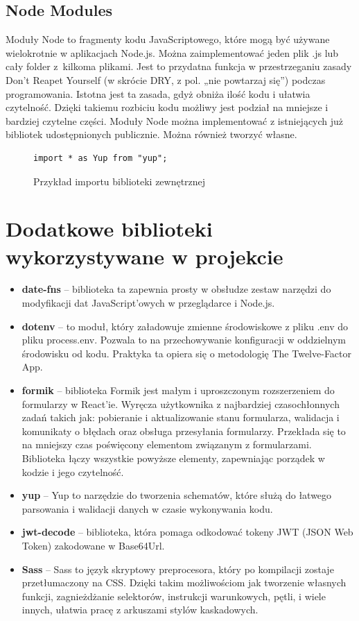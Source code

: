 \documentclass[a4paper,twoside,12pt]{book}
\begin{document}
\subsection{Node Modules}
Moduły Node to fragmenty kodu JavaScriptowego, które mogą być używane wielokrotnie w aplikacjach Node.js. Można zaimplementować jeden plik .js lub cały folder z~kilkoma plikami. Jest to przydatna funkcja w przestrzeganiu zasady Don't Reapet Yourself (w skrócie DRY, z pol. „nie powtarzaj się”) podczas programowania. Istotna jest ta zasada, gdyż obniża ilość kodu i ułatwia czytelność. Dzięki takiemu rozbiciu kodu możliwy jest podział na mniejsze i bardziej czytelne części. Moduły Node można implementować z istniejących już bibliotek udostępnionych publicznie. Można również tworzyć własne.
\begin{figure}[H]
    \begin{lstlisting}
import * as Yup from "yup";
    \end{lstlisting}
    \caption{Przykład importu biblioteki zewnętrznej}
    \label{fig:pseudokod:listings}
\end{figure}
\section{Dodatkowe biblioteki wykorzystywane w projekcie}
\begin{itemize}
    \item \textbf{date-fns} -- biblioteka ta zapewnia prosty w obsłudze zestaw narzędzi do modyfikacji dat JavaScript’owych w przeglądarce i Node.js.
    \item \textbf{dotenv} -- to moduł, który załadowuje zmienne środowiskowe z pliku .env do pliku process.env. Pozwala to na przechowywanie konfiguracji w oddzielnym środowisku od kodu. Praktyka ta opiera się o metodologię  The Twelve-Factor App.
    \item \textbf{formik} -- biblioteka Formik jest małym i uproszczonym rozszerzeniem do formularzy w React’ie. Wyręcza użytkownika z najbardziej czasochłonnych zadań takich jak: pobieranie i aktualizowanie stanu formularza, walidacja i komunikaty o błędach oraz obsługa przesyłania formularzy. Przekłada się to na mniejszy czas poświęcony elementom związanym z formularzami. Biblioteka łączy wszystkie powyższe elementy, zapewniając porządek w kodzie i jego czytelność.
    \item \textbf{yup} -- Yup to narzędzie do tworzenia schematów, które służą do łatwego parsowania i walidacji danych w czasie wykonywania kodu.
    \item \textbf{jwt-decode} -- biblioteka, która pomaga odkodować tokeny JWT (JSON Web Token) zakodowane w Base64Url.
    \item \textbf{Sass} -- Sass to język skryptowy preprocesora, który po kompilacji zostaje przetłumaczony na CSS. Dzięki takim możliwościom jak tworzenie własnych funkcji, zagnieżdżanie selektorów, instrukcji warunkowych, pętli, i wiele innych, ułatwia pracę z arkuszami stylów kaskadowych.
\end{itemize}
\newpage
\end{document}

